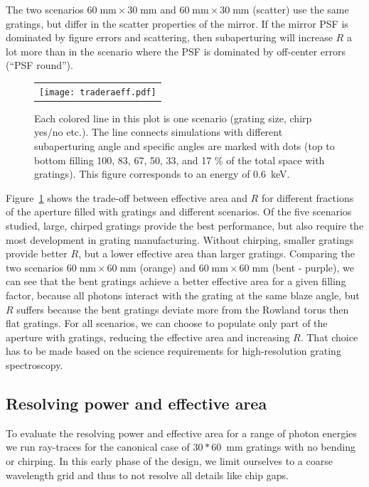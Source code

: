 \documentclass[12pt]{spieman}  %
\begin{document}
\begin{spacing}{1}
The two scenarios $60\;\mathrm{mm}\times 30\;\mathrm{mm}$ and $60\;\mathrm{mm}\times 30\;\mathrm{mm}$ (scatter) use the same gratings, but differ in the scatter properties of the mirror. If the mirror PSF is dominated by figure errors and scattering, then subaperturing will increase $R$ a lot more than in the scenario where the PSF is dominated by off-center errors (``PSF round'').

\begin{figure} [ht]
  \begin{center}
  \begin{tabular}{c} %
  \texttt{[image: traderaeff.pdf]}
  \end{tabular}
  \end{center}
  \caption {\label{fig:trade}
  Each colored line in this plot is one scenario (grating size, chirp yes/no etc.). The line connects simulations with different subaperturing angle and specific angles are marked with dots (top to bottom filling 100, 83, 67, 50, 33, and 17 \% of the total space with gratings). This figure corresponds to an energy of 0.6~keV.
  }
\end{figure}

Figure~\ref{fig:trade} shows the trade-off between effective area and $R$ for different fractions of the aperture filled with gratings and different scenarios. Of the five scenarios studied, large, chirped gratings provide the best performance, but also require the most development in grating manufacturing. Without chirping, smaller gratings provide better $R$, but a lower effective area than larger gratings.  Comparing the two scenarios $60\;\mathrm{mm}\times 60\;\mathrm{mm}$  (orange) and $60\;\mathrm{mm}\times 60\;\mathrm{mm}$ (bent - purple), we can see that the bent gratings achieve a better effective area for a given filling factor, because all photons interact with the grating at the same blaze angle, but $R$ suffers because the bent gratings deviate more from the Rowland torus then flat gratings.
For all scenarios, we can choose to populate only part of the aperture with gratings, reducing the effective area and increasing $R$. That choice has to be made based on the science requirements for high-resolution grating spectroscopy.

\subsection{Resolving power and effective area}
To evaluate the resolving power and effective area for a range of photon energies we run ray-traces for the canonical case of $30 * 60$~mm gratings with no bending or chirping. In this early phase of the design, we limit ourselves to a coarse wavelength grid and thus to not resolve all details like chip gaps.


\end{spacing}
\end{document}
